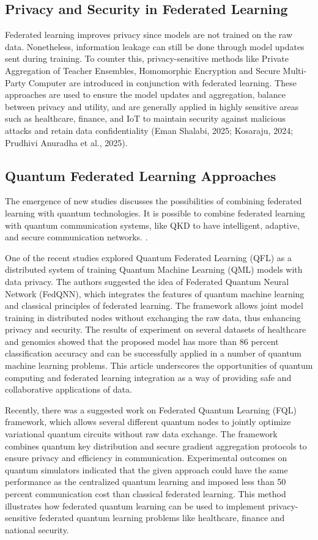 \documentclass[conference]{IEEEtran}
\begin{document}
\subsection{Privacy and Security in Federated Learning}

Federated learning improves privacy since models are not trained on the raw data. Nonetheless, information leakage can still be done through model updates sent during training. To counter this, privacy-sensitive methods like Private Aggregation of Teacher Ensembles, Homomorphic Encryption and Secure Multi-Party Computer are introduced in conjunction with federated learning. These approaches are used to ensure the model updates and aggregation, balance between privacy and utility, and are generally applied in highly sensitive areas such as healthcare, finance, and IoT to maintain security against malicious attacks and retain data confidentiality (Eman Shalabi, 2025; Kosaraju, 2024; Prudhivi Anuradha et al., 2025).  \cite{b13} 


\subsection {Quantum Federated Learning Approaches}

The emergence of new studies discusses the possibilities of combining federated learning with quantum technologies. It is possible to combine federated learning with quantum communication systems, like QKD to have intelligent, adaptive, and secure communication networks. \cite{b10}.

One of the recent studies explored Quantum Federated Learning (QFL) as a distributed system of training Quantum Machine Learning (QML) models with data privacy. The authors suggested the idea of Federated Quantum Neural Network (FedQNN), which integrates the features of quantum machine learning and classical principles of federated learning. The framework allows joint model training in distributed nodes without exchanging the raw data, thus enhancing privacy and security. The results of experiment on several datasets of healthcare and genomics showed that the proposed model has more than 86 percent classification accuracy and can be successfully applied in a number of quantum machine learning problems. This article underscores the opportunities of quantum computing and federated learning integration as a way of providing safe and collaborative applications of data.
 \cite{b14}


Recently, there was a suggested work on Federated Quantum Learning (FQL) framework, which allows several different quantum nodes to jointly optimize variational quantum circuits without raw data exchange. The framework combines quantum key distribution and secure gradient aggregation protocols to ensure privacy and efficiency in communication. Experimental outcomes on quantum simulators indicated that the given approach could have the same performance as the centralized quantum learning and imposed less than 50 percent communication cost than classical federated learning. This method illustrates how federated quantum learning can be used to implement privacy-sensitive federated quantum learning problems like healthcare, finance and national security.  \cite{b15}
\end{document}
